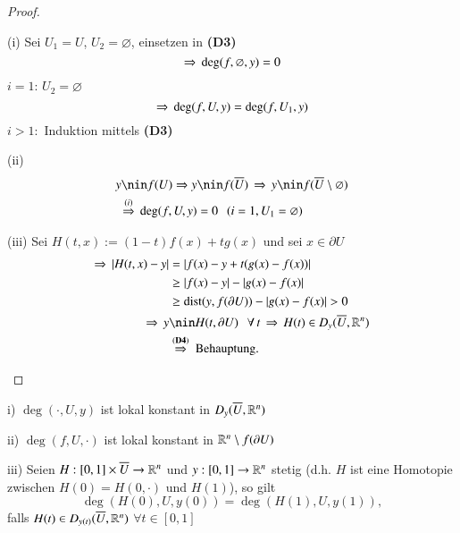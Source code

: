 \begin{proof}
    \begin{description}
    \item{(i)}
    Sei $U_1=U$, $U_2=\varnothing$, einsetzen in \textbf{(D3)}
    \[
        \Rightarrow \, \deg(f,\varnothing,y)=0
    \]
    $i=1$: $U_2=\varnothing$
    \[
        \Rightarrow \, \deg(f,U,y)=\deg(f,U_1,y)
    \]
    $i>1:$ Induktion mittels \textbf{(D3)}
    \item{(ii)}
    \begin{align*}
        y\nin f(U) \Ra y &\nin f(\ol U)\, \Ra \, y\nin f(\ol U\setminus \varnothing)\\
        \overset{(i)}{\Ra } \, \deg (f,U,y)&=0 \qq (i=1, U_1=\varnothing)
    \end{align*}
    \item{(iii)}
    Sei $H(t,x):=(1-t)f(x)+tg(x)$ und sei $x\in \partial U$
    \begin{align*}
        \Ra \, |H(t,x)-y|&= |f(x)-y+t(g(x)-f(x))|\\
            &\geq |f(x)-y| - |g(x)-f(x)|\\
            &\geq \dist(y,f(\partial U))- |g(x)-f(x)| >0\\
        \Ra \, y&\nin H(t,\partial U) \qq \forall \, t\,\Ra \,H(t)\in D_y(\ol U,\R^n)\\
        &\overset{(\textbf{D4})}{\Ra} \text{ Behauptung.}
    \end{align*}
    \end{description}
    \[ \]
\end{proof}

\begin{theorem}\label{2.2}
    \begin{description}
        \item{i)} $\deg(\cdot,U,y)$ ist lokal konstant in $D_y(\overline U,\mathbb{R}^n)$
        \item{ii)} $\deg(f,U,\cdot)$ ist lokal konstant in $\mathbb{R}^n\setminus f(\partial U)$
        \item{iii)} Seien $H:[0,1]\times \overline U\rightarrow \mathbb{R}^n$ und $y:[0,1]\rightarrow \mathbb{R}^n$ stetig (d.h. $H$ ist eine
            Homotopie zwischen $H(0)=H(0,\cdot)$ und $H(1)$), so gilt
        \[
            \deg(H(0),U,y(0))=\deg(H(1),U,y(1)),
        \]
        falls $H(t)\in D_{y(t)}(\overline U, \mathbb{R}^n)$ $\forall t \in [0,1]$
    \end{description}
\end{theorem}

